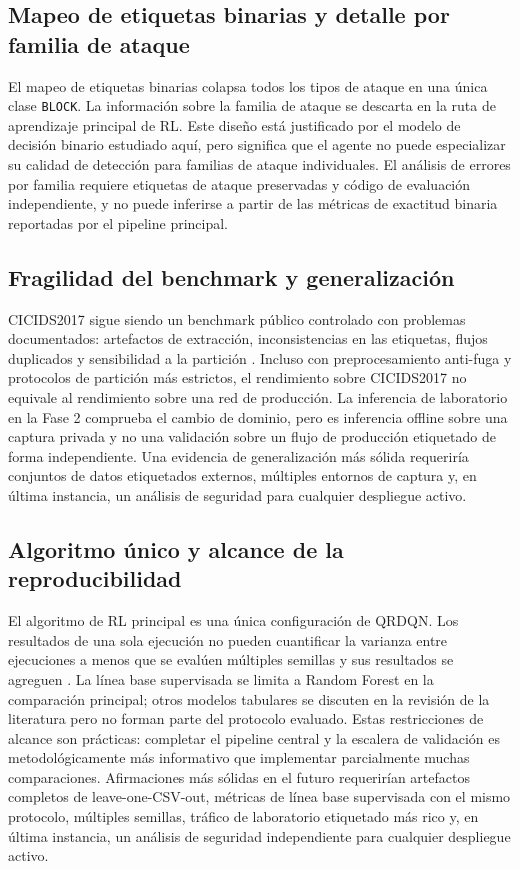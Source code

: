\subsection{Mapeo de etiquetas binarias y detalle por familia de ataque}
El mapeo de etiquetas binarias colapsa todos los tipos de ataque en una única clase \texttt{BLOCK}. La información sobre la familia de ataque se descarta en la ruta de aprendizaje principal de RL. Este diseño está justificado por el modelo de decisión binario estudiado aquí, pero significa que el agente no puede especializar su calidad de detección para familias de ataque individuales. El análisis de errores por familia requiere etiquetas de ataque preservadas y código de evaluación independiente, y no puede inferirse a partir de las métricas de exactitud binaria reportadas por el pipeline principal.

\subsection{Fragilidad del benchmark y generalización}
CICIDS2017 sigue siendo un benchmark público controlado con problemas documentados: artefactos de extracción, inconsistencias en las etiquetas, flujos duplicados y sensibilidad a la partición \parencite{Engelen2021CICIDSIssues,Lanvin2023Errors,Liu2022ErrorPrevalenceNIDS}. Incluso con preprocesamiento anti-fuga y protocolos de partición más estrictos, el rendimiento sobre CICIDS2017 no equivale al rendimiento sobre una red de producción. La inferencia de laboratorio en la Fase 2 comprueba el cambio de dominio, pero es inferencia offline sobre una captura privada y no una validación sobre un flujo de producción etiquetado de forma independiente. Una evidencia de generalización más sólida requeriría conjuntos de datos etiquetados externos, múltiples entornos de captura y, en última instancia, un análisis de seguridad para cualquier despliegue activo.

\subsection{Algoritmo único y alcance de la reproducibilidad}
El algoritmo de RL principal es una única configuración de QRDQN. Los resultados de una sola ejecución no pueden cuantificar la varianza entre ejecuciones a menos que se evalúen múltiples semillas y sus resultados se agreguen \parencite{SuttonBarto2018RL}. La línea base supervisada se limita a Random Forest en la comparación principal; otros modelos tabulares se discuten en la revisión de la literatura pero no forman parte del protocolo evaluado. Estas restricciones de alcance son prácticas: completar el pipeline central y la escalera de validación es metodológicamente más informativo que implementar parcialmente muchas comparaciones. Afirmaciones más sólidas en el futuro requerirían artefactos completos de leave-one-CSV-out, métricas de línea base supervisada con el mismo protocolo, múltiples semillas, tráfico de laboratorio etiquetado más rico y, en última instancia, un análisis de seguridad independiente para cualquier despliegue activo.
